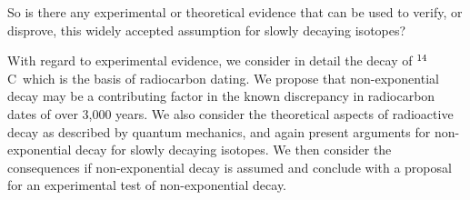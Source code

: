 \documentclass[12pt]{article}
\newcommand{\cft}{$^{\rm 14}$C}
\begin{document}

So is there any experimental or theoretical evidence that can be used to 
verify, or disprove, this widely accepted assumption for slowly decaying 
isotopes? 

With regard to experimental evidence, we consider in detail the decay of
\cft~which is the basis of radiocarbon
dating. We propose that non-exponential decay may be a contributing factor 
in the known discrepancy in radiocarbon dates of over 3,000 years.
We also consider the theoretical aspects of radioactive decay as described
by quantum mechanics, and again present arguments for non-exponential decay
for slowly decaying isotopes.
We then consider the consequences if non-exponential decay is assumed 
and conclude with a proposal for an experimental test of non-exponential
decay.





\end{document}
